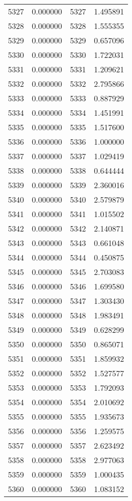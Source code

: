 \documentclass[12pt]{article}
\begin{document}
\begin{longtable}{@{}cccc@{}}
5327 & 0.000000 & 5327 & 1.495891 \\
5328 & 0.000000 & 5328 & 1.555355 \\
5329 & 0.000000 & 5329 & 0.657096 \\
5330 & 0.000000 & 5330 & 1.722031 \\
5331 & 0.000000 & 5331 & 1.209621 \\
5332 & 0.000000 & 5332 & 2.795866 \\
5333 & 0.000000 & 5333 & 0.887929 \\
5334 & 0.000000 & 5334 & 1.451991 \\
5335 & 0.000000 & 5335 & 1.517600 \\
5336 & 0.000000 & 5336 & 1.000000 \\
5337 & 0.000000 & 5337 & 1.029419 \\
5338 & 0.000000 & 5338 & 0.644444 \\
5339 & 0.000000 & 5339 & 2.360016 \\
5340 & 0.000000 & 5340 & 2.579879 \\
5341 & 0.000000 & 5341 & 1.015502 \\
5342 & 0.000000 & 5342 & 2.140871 \\
5343 & 0.000000 & 5343 & 0.661048 \\
5344 & 0.000000 & 5344 & 0.450875 \\
5345 & 0.000000 & 5345 & 2.703083 \\
5346 & 0.000000 & 5346 & 1.699580 \\
5347 & 0.000000 & 5347 & 1.303430 \\
5348 & 0.000000 & 5348 & 1.983491 \\
5349 & 0.000000 & 5349 & 0.628299 \\
5350 & 0.000000 & 5350 & 0.865071 \\
5351 & 0.000000 & 5351 & 1.859932 \\
5352 & 0.000000 & 5352 & 1.527577 \\
5353 & 0.000000 & 5353 & 1.792093 \\
5354 & 0.000000 & 5354 & 2.010692 \\
5355 & 0.000000 & 5355 & 1.935673 \\
5356 & 0.000000 & 5356 & 1.259575 \\
5357 & 0.000000 & 5357 & 2.623492 \\
5358 & 0.000000 & 5358 & 2.977063 \\
5359 & 0.000000 & 5359 & 1.000435 \\
5360 & 0.000000 & 5360 & 1.083152 \\

\end{longtable}
\end{document}

